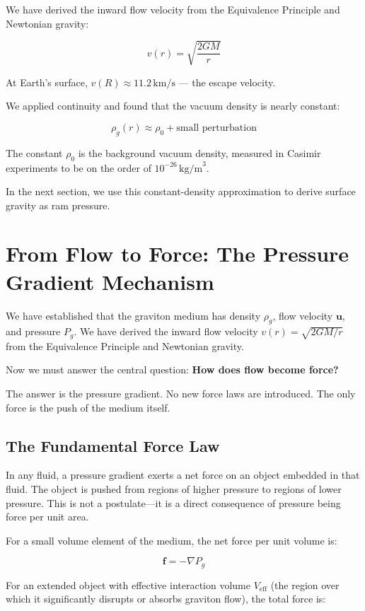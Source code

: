 \documentclass[12pt, a4paper]{article}
\begin{document}
We have derived the inward flow velocity from the Equivalence Principle and Newtonian gravity:

\[
v(r) = \sqrt{\frac{2GM}{r}}
\]

At Earth's surface, \( v(R) \approx 11.2 \, \text{km/s} \) — the escape velocity.

We applied continuity and found that the vacuum density is nearly constant:

\[
\rho_g(r) \approx \rho_0 + \text{small perturbation}
\]

The constant \( \rho_0 \) is the background vacuum density, measured in Casimir experiments to be on the order of \( 10^{-26} \, \text{kg/m}^3 \).

In the next section, we use this constant-density approximation to derive surface gravity as ram pressure.

\section{From Flow to Force: The Pressure Gradient Mechanism}
\label{sec:pressure_gradient}

We have established that the graviton medium has density \( \rho_g \), flow velocity \( \mathbf{u} \), and pressure \( P_g \). We have derived the inward flow velocity \( v(r) = \sqrt{2GM/r} \) from the Equivalence Principle and Newtonian gravity.

Now we must answer the central question: \textbf{How does flow become force?}

The answer is the pressure gradient. No new force laws are introduced. The only force is the push of the medium itself.

\subsection{The Fundamental Force Law}
\label{subsec:force_law}

In any fluid, a pressure gradient exerts a net force on an object embedded in that fluid. The object is pushed from regions of higher pressure to regions of lower pressure. This is not a postulate—it is a direct consequence of pressure being force per unit area.

For a small volume element of the medium, the net force per unit volume is:

\[
\mathbf{f} = -\nabla P_g
\]

For an extended object with effective interaction volume \( V_{\text{eff}} \) (the region over which it significantly disrupts or absorbs graviton flow), the total force is:
\end{document}
